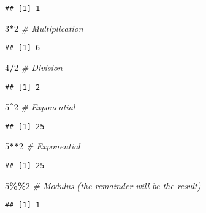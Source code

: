\documentclass[
]{article}
\newenvironment{Shaded}{\begin{snugshade}}{\end{snugshade}}
\newcommand{\CommentTok}[1]{\textcolor[rgb]{0.56,0.35,0.01}{\textit{#1}}}
\newcommand{\DecValTok}[1]{\textcolor[rgb]{0.00,0.00,0.81}{#1}}
\newcommand{\SpecialCharTok}[1]{\textcolor[rgb]{0.81,0.36,0.00}{\textbf{#1}}}
\begin{document}
\begin{verbatim}
## [1] 1
\end{verbatim}

\begin{Shaded}
\begin{Highlighting}[]
\DecValTok{3}\SpecialCharTok{*}\DecValTok{2} \CommentTok{\# Multiplication}
\end{Highlighting}
\end{Shaded}

\begin{verbatim}
## [1] 6
\end{verbatim}

\begin{Shaded}
\begin{Highlighting}[]
\DecValTok{4}\SpecialCharTok{/}\DecValTok{2} \CommentTok{\# Division}
\end{Highlighting}
\end{Shaded}

\begin{verbatim}
## [1] 2
\end{verbatim}

\begin{Shaded}
\begin{Highlighting}[]
\DecValTok{5}\SpecialCharTok{\^{}}\DecValTok{2} \CommentTok{\# Exponential}
\end{Highlighting}
\end{Shaded}

\begin{verbatim}
## [1] 25
\end{verbatim}

\begin{Shaded}
\begin{Highlighting}[]
\DecValTok{5}\SpecialCharTok{**}\DecValTok{2} \CommentTok{\# Exponential}
\end{Highlighting}
\end{Shaded}

\begin{verbatim}
## [1] 25
\end{verbatim}

\begin{Shaded}
\begin{Highlighting}[]
\DecValTok{5}\SpecialCharTok{\%\%}\DecValTok{2} \CommentTok{\# Modulus (the remainder will be the result)}
\end{Highlighting}
\end{Shaded}

\begin{verbatim}
## [1] 1
\end{verbatim}
\end{document}
